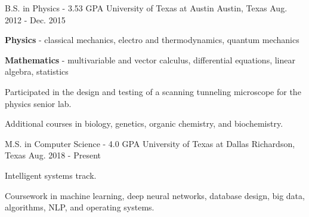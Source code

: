 

\begin{cventries}

  \cventry
    {B.S. in Physics - 3.53 GPA} %
    {University of Texas at Austin} %
    {Austin, Texas} %
    {Aug. 2012 - Dec. 2015} %
    {
      \begin{cvitems} %
        \item {
			\textbf{Physics} - classical mechanics, electro and
			thermodynamics, quantum mechanics
		}
        \item {
			\textbf{Mathematics} - multivariable and vector
			calculus,
			differential equations, linear algebra,
			statistics
		}
        \item {
			Participated in the design and testing of a scanning
			tunneling microscope for the physics senior lab.
		}
        \item {
			Additional courses in biology, genetics, organic
			chemistry, and biochemistry.
		}
      \end{cvitems}
    }

  \cventry
    {M.S. in Computer Science - 4.0 GPA} %
    {University of Texas at Dallas} %
    {Richardson, Texas} %
    {Aug. 2018 - Present} %
    {
      \begin{cvitems} %
        \item {Intelligent systems track.}
        \item {
			Coursework in machine learning, deep neural networks,
			database design, big data, algorithms, NLP, and operating
			systems.
		}
      \end{cvitems}
    }

\end{cventries}
